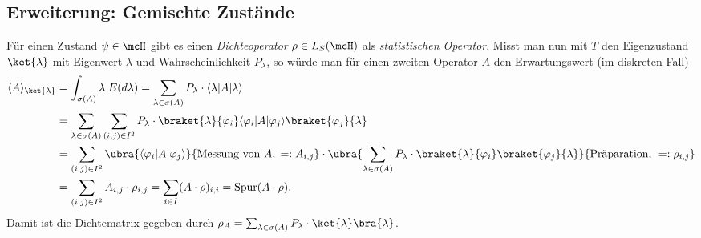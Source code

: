 \documentclass{subfiles}
\begin{document}
    \subsection{Erweiterung: Gemischte Zustände}
        Für einen Zustand $\psi\in\mcH$ gibt es einen \emph{Dichteoperator} $\rho\in L_S(\mcH)$ als \emph{statistischen Operator}. Misst man nun mit $T$ den Eigenzustand $\ket{\lambda}$ mit Eigenwert $\lambda$ und Wahrscheinlichkeit $P_\lambda$, so würde man für einen zweiten Operator $A$ den Erwartungswert (im diskreten Fall)
        \begin{align*}
            \langle A\rangle_\ket{\lambda} &= \int_{\sigma(A)}\lambda\;E(d\lambda) = \sum_{\lambda\in\sigma(A)} P_\lambda\cdot\langle\lambda|A|\lambda\rangle  \\
            &=\sum_{\lambda\in\sigma(A)}\sum_{(i,j)\in I^2} P_\lambda\cdot\braket{\lambda}{\varphi_i}\langle\varphi_i|A|\varphi_j\rangle\braket{\varphi_j}{\lambda} \\
            &= \sum_{(i,j)\in I^2}\ubra{\langle\varphi_i|A|\varphi_j\rangle}{\text{Messung von }A,\;=:A_{i,j}}\cdot \ubra{\sum_{\lambda\in\sigma(A)} P_\lambda\cdot\braket{\lambda}{\varphi_i}\braket{\varphi_j}{\lambda}}{\text{Präparation, }=:\rho_{i,j}} \\
            &= \sum_{(i,j)\in I^2}A_{i,j}\cdot\rho_{i,j} = \sum_{i\in I} (A\cdot\rho)_{i,i} = \text{Spur}(A\cdot\rho).
        \end{align*}
        Damit ist die Dichtematrix gegeben durch $\rho_A = \sum_{\lambda\in\sigma(A)}P_\lambda\cdot\ket{\lambda}\bra{\lambda}$. 
\end{document}
